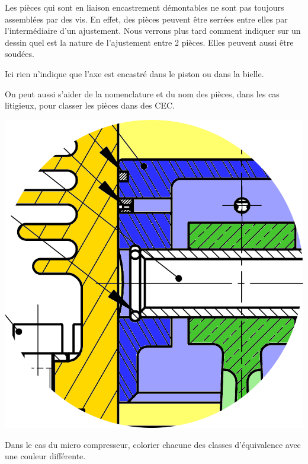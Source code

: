 \documentclass[10pt,oneside]{article}
\begin{document}
\begin{rem}
\begin{minipage}[c]{.6\linewidth}
Les pièces qui sont en liaison encastrement démontables ne sont pas toujours assemblées par des vis. En effet, des pièces peuvent être serrées entre elles par l'intermédiaire d'un ajustement. 
Nous verrons plus tard comment indiquer sur un dessin quel est la nature de l'ajustement entre 2 pièces. Elles peuvent aussi être soudées.

Ici rien n'indique que l'axe est encastré dans le piston ou dans la bielle. 

On peut aussi s'aider de la nomenclature et du nom des pièces, dans les cas litigieux, pour classer les pièces dans des CEC.
\end{minipage} \hfill
\begin{minipage}[c]{.3\linewidth}
\begin{center}
\includegraphics[width=.9\textwidth]{png/axe}
\end{center}
\end{minipage}
\end{rem}

\begin{exemple}
Dans le cas du micro compresseur, colorier chacune des classes d'équivalence avec une couleur différente.
\end{exemple}
\end{document}

